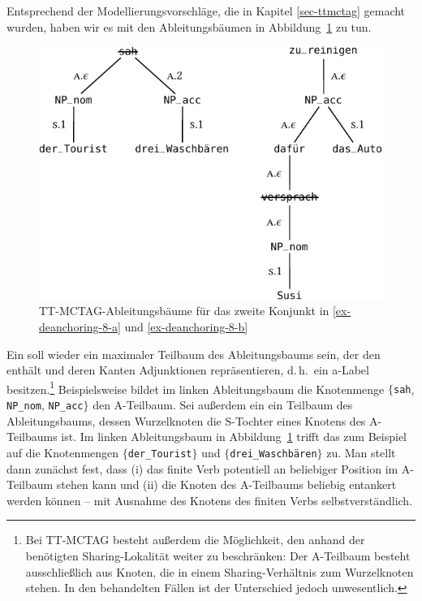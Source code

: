 Entsprechend der Modellierungsvorschläge, die in Kapitel \ref{sec-ttmctag} gemacht wurden, haben wir es mit den Ableitungsbäumen in Abbildung~\ref{fig-deanchoring-10} zu tun. 
\begin{figure}[t]
\centering
\includegraphics{graphics/abb826.pdf}
\caption{\label{fig-deanchoring-10}TT-MCTAG-Ableitungsbäume für das zweite Konjunkt in \ref{ex-deanchoring-8-a} und \ref{ex-deanchoring-8-b}}
\end{figure}
Ein  soll wieder ein maximaler Teilbaum des Ableitungsbaums sein, der den  enthält und deren Kanten Adjunktionen repräsentieren, d.\,h.\ ein {\sc a}-Label besitzen.\footnote{Bei TT-MCTAG besteht außerdem die Möglichkeit, den   anhand der benötigten Sharing-Lokalität weiter zu beschränken: Der A-Teilbaum besteht ausschlie\ss lich aus Knoten, die in einem Sharing-Verhältnis zum Wurzelknoten stehen. In den behandelten Fällen ist der Unterschied jedoch unwesentlich.} Beispielsweise bildet im linken Ableitungsbaum die Knotenmenge $\{${\tt sah}, {\tt NP\_nom}, {\tt NP\_acc}$\}$ den A-Teilbaum. Sei au\ss erdem ein  ein Teilbaum des Ableitungsbaums, dessen Wurzelknoten die S-Tochter eines Knotens des A-Teilbaums ist. Im linken Ableitungsbaum in Abbildung~\ref{fig-deanchoring-10} trifft das zum Beispiel auf die Knotenmengen $\{${\tt der\_Tourist}$\}$ und $\{${\tt drei\_Waschbären}$\}$ zu. Man stellt dann zunächst fest, dass (i) das finite Verb potentiell an beliebiger Position im A-Teilbaum stehen kann und (ii) die Knoten des A-Teilbaums beliebig entankert werden können -- mit Ausnahme des Knotens des finiten Verbs selbstverständlich. 

